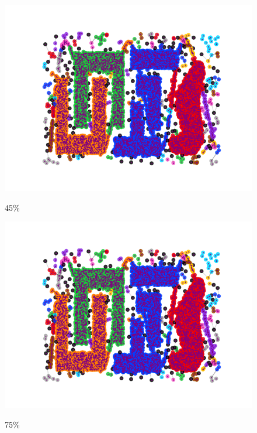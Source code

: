 \documentclass[12pt, a4paper, twocolumn]{article}
\newcommand{\githubPics}{https://raw.githubusercontent.com/artamono1/druhg/master/papers/druhg/}
\begin{document}
\begin{figure}[!htb]
\begin{minipage}[c]{0.40\linewidth}
  \end{minipage}
  \begin{minipage}[c]{0.40\linewidth}
    \href{\githubPics run_chameleon45.png}{\includegraphics[width=\linewidth]{run_chameleon45.png}}\caption*{45\%}
  \end{minipage}
  \begin{minipage}[c]{0.40\linewidth}
    \href{\githubPics run_chameleon75.png}{\includegraphics[width=\linewidth]{run_chameleon75.png}}\caption*{75\%}
  \end{minipage}
  \begin{minipage}[c]{0.40\linewidth}

\end{minipage}
\end{figure}
\end{document}
